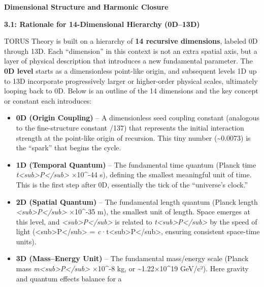 \documentclass[
]{article}
\begin{document}
\textbf{Dimensional Structure and Harmonic Closure}

\textbf{3.1: Rationale for 14-Dimensional Hierarchy (0D--13D)}

TORUS Theory is built on a hierarchy of \textbf{14 recursive
dimensions}, labeled 0D through 13D. Each ``dimension'' in this context
is not an extra spatial axis, but a layer of physical description that
introduces a new fundamental parameter. The \textbf{0D level} starts as
a dimensionless point-like origin, and subsequent levels 1D up to 13D
incorporate progressively larger or higher-order physical scales,
ultimately looping back to 0D. Below is an outline of the 14 dimensions
and the key concept or constant each introduces:

\begin{itemize}
\item
  \textbf{0D (Origin Coupling)} -- A dimensionless seed coupling
  constant (analogous to the fine-structure constant \alpha {}/137) that
  represents the initial interaction strength at the point-like origin
  of recursion\hspace{0pt}. This tiny number (\textasciitilde0.0073) is
  the ``spark'' that begins the cycle.
\item
  \textbf{1D (Temporal Quantum)} -- The fundamental time quantum (Planck
  time \emph{t\textless sub\textgreater P\textless/sub\textgreater{}} ×10\^{}-44 s), defining the smallest meaningful unit of time. This
  is the first step after 0D, essentially the tick of the ``universe's
  clock.''
\item
  \textbf{2D (Spatial Quantum)} -- The fundamental length quantum
  (Planck length
  \emph{\ell\textless sub\textgreater P\textless/sub\textgreater{}} ×10\^{}-35 m), the smallest unit of length\hspace{0pt}. Space
  emerges at this level, and
  \emph{\ell\textless sub\textgreater P\textless/sub\textgreater{}} is
  related to
  \emph{t\textless sub\textgreater P\textless/sub\textgreater{}} by the
  speed of light
  (\ell\textless sub\textgreater P\textless/sub\textgreater{} =
  \emph{c}·t\textless sub\textgreater P\textless/sub\textgreater,
  ensuring consistent space-time units).
\item
  \textbf{3D (Mass--Energy Unit)} -- The fundamental mass/energy scale
  (Planck mass
  \emph{m\textless sub\textgreater P\textless/sub\textgreater{}} ×10\^{}-8 kg, or \textasciitilde1.22×10\^{}19
  GeV/c²)\hspace{0pt}. Here gravity and quantum effects balance for a

\end{itemize}
\end{document}
